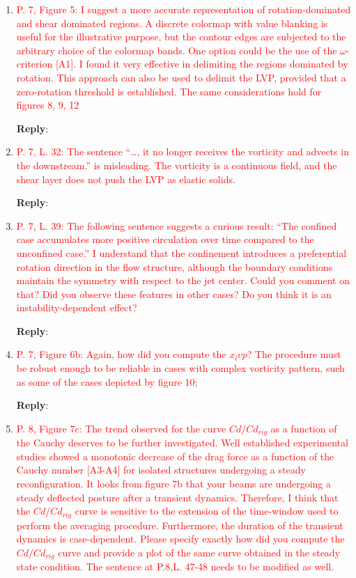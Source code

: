 \documentclass[onecolumn,a4paper,amsmath,amssym,pre]{revtex4}
\begin{document}
{\begin{enumerate}
	\textbf{Reply}:
	
	\item \textcolor{red}{P. 7, Figure 5: I suggest a more accurate representation of rotation-dominated and shear dominated regions. A discrete colormap with value blanking is useful for the illustrative purpose, but the contour edges are subjected to the arbitrary choice of the colormap bands. One option could be the use of the $\omega$-criterion [A1]. I found it very effective in delimiting the regions dominated by rotation. This approach can also be used to delimit the LVP, provided that a zero-rotation threshold is established. The same considerations hold for figures 8, 9,	12}
	
	\textbf{Reply}:
	
	\item \textcolor{red}{P. 7, L. 32: The sentence “…, it no longer receives the vorticity and advects in the downstream.” is misleading. The vorticity is a continuous field, and the shear layer does not push the LVP as elastic solids.}
	
	\textbf{Reply}:
	
	\item \textcolor{red}{P. 7, L. 39: The following sentence suggests a curious result: “The confined case accumulates more positive circulation over time compared to the unconfined case.” I understand that the confinement introduces a preferential rotation direction in the flow structure, although the boundary conditions maintain the symmetry with respect to the jet center. Could you comment on that? Did you observe these features in other cases? Do you think it is an instability-dependent effect?}
	
	\textbf{Reply}:
	
	\item \textcolor{red}{P. 7, Figure 6b: Again, how did you compute the $x_lvp$? The procedure must be robust enough to be reliable in cases with complex vorticity pattern, such as some of the cases depicted by figure 10;}
	
	\textbf{Reply}:
	
	\item \textcolor{red}{P. 8, Figure 7c: The trend observed for the curve $Cd/Cd_{rig}$ as a function of the Cauchy deserves to be further investigated. Well established experimental studies showed a monotonic decrease of the drag force as a function of the Cauchy number [A3-A4] for isolated structures undergoing a steady reconfiguration. It looks from figure 7b that your beams are undergoing a steady deflected posture after a transient dynamics. Therefore, I think that the $Cd/Cd_{rig}$ curve is sensitive to the extension of the time-window used to perform the averaging procedure. Furthermore, the duration of the transient dynamics is case-dependent. Please specify exactly how did you compute the $Cd/Cd_{rig}$ curve and provide a plot of the same curve obtained in the steady state condition. The sentence at P.8,L. 47-48 needs to be modified as well.}
	

\end{enumerate}}
\end{document}
